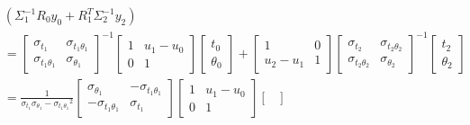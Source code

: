 \documentclass{article}
\begin{document}
        \begin{align*}
            &\!\left( \Sigma_1^{-1} R_0 y_0 + R_1^T \Sigma_2^{-1} y_2 \right)
            \\
            &=
            \begin{bmatrix}
                \sigma_{t_1} & \sigma_{t_1\theta_1}\\
                \sigma_{t_1\theta_1} & \sigma_{\theta_1}
            \end{bmatrix}^{-1}
            \begin{bmatrix}
                1 & u_1-u_0\\
                0 & 1
            \end{bmatrix}
            \begin{bmatrix}
                t_0\\
                \theta_0
            \end{bmatrix}
            +
            \begin{bmatrix}
                1 & 0\\
                u_2-u_1 & 1
            \end{bmatrix}
            \begin{bmatrix}
                \sigma_{t_2} & \sigma_{t_2\theta_2}\\
                \sigma_{t_2\theta_2} & \sigma_{\theta_2}
            \end{bmatrix}^{-1}
            \begin{bmatrix}
                t_2\\
                \theta_2
            \end{bmatrix}
            \\
            \!\!\!\!\!\!\!\!\!\!\!\!\!\!\!\!\!\!\!\!\!\!\!\!\!\!\!\!\!\!\!\!\!\!\!
            &=
            \tfrac{1}{\sigma_{t_1}\sigma_{\theta_1}-{\sigma_{t_1\theta_1}}^2}
            \begin{bmatrix}
                \sigma_{\theta_1} & -\sigma_{t_1\theta_1}\\
                -\sigma_{t_1\theta_1} & \sigma_{t_1}
            \end{bmatrix}\!\!
            \begin{bmatrix}
                1 & u_1-u_0\\
                0 & 1
            \end{bmatrix}\!\!
            \begin{bmatrix}

\end{bmatrix}
\end{align*}
\end{document}
